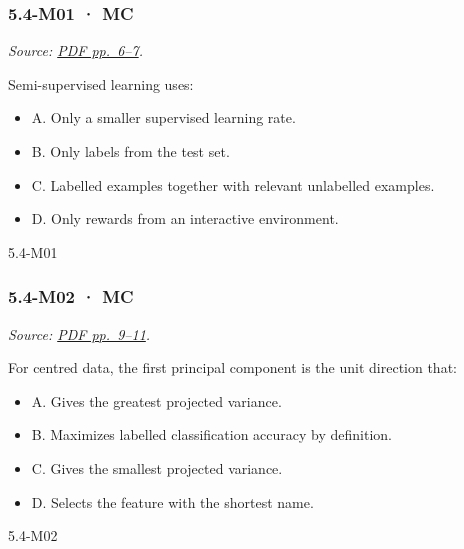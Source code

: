 \noindent\begin{minipage}{\linewidth}

\subsubsection{5.4-M01 · MC}\label{m01-mc-15}

\emph{Source:
\href{../Lecture\%20Slides/5.4.\%20Unsupervised\%20learning.pdf\#page=6}{PDF
pp.~6--7}.}

Semi-supervised learning uses:

\begin{itemize}
\tightlist
\item
  A. Only a smaller supervised learning rate.
\item
  B. Only labels from the test set.
\item
  C. Labelled examples together with relevant unlabelled examples.
\item
  D. Only rewards from an interactive environment.
\end{itemize}

\begin{solution}[8mm]{5.4-M01}

\end{solution}
\end{minipage}\par\medskip

\noindent\begin{minipage}{\linewidth}

\subsubsection{5.4-M02 · MC}\label{m02-mc-15}

\emph{Source:
\href{../Lecture\%20Slides/5.4.\%20Unsupervised\%20learning.pdf\#page=9}{PDF
pp.~9--11}.}

For centred data, the first principal component is the unit direction
that:

\begin{itemize}
\tightlist
\item
  A. Gives the greatest projected variance.
\item
  B. Maximizes labelled classification accuracy by definition.
\item
  C. Gives the smallest projected variance.
\item
  D. Selects the feature with the shortest name.
\end{itemize}

\begin{solution}[8mm]{5.4-M02}

\end{solution}
\end{minipage}\par\medskip

